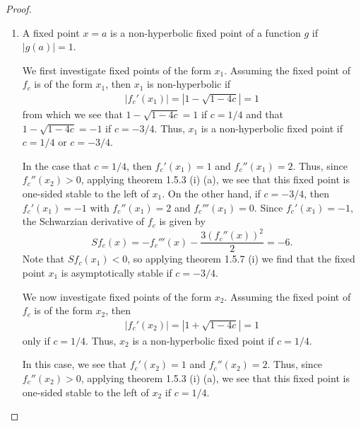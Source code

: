 \begin{proof}
\begin{enumerate}
    \item A fixed point $x = a$ is a non-hyperbolic fixed point of a function $g$ if $|g(a)| =1$.

      We first investigate fixed points of the form $x_1$. Assuming the fixed point of $f_c$ is of the form $x_1$,
      then $x_1$ is non-hyperbolic if
      \begin{align*}
        |f_c'(x_1)| = \left|1-\sqrt{1-4c}\right| = 1
      \end{align*}
      from which we see that $1-\sqrt{1-4c} = 1$ if $c = 1/4$ and that $1-\sqrt{1-4c} = -1$ if $c=-3/4$.
      Thus, $x_1$ is a non-hyperbolic fixed point if $c= 1/4$ or $c=-3/4$.

      In the case that $c=1/4$, then $f_c'(x_1) = 1$ and $f_c''(x_1) = 2$. Thus, since $f_c''(x_2) > 0$, applying theorem 1.5.3 (i) (a), we see that
      this fixed point is one-sided stable to the left of $x_1$. On the other hand, if $c=-3/4$, then $f_c'(x_1) = -1$ with $f_c''(x_1) = 2$ and $f_c'''(x_1) = 0$.
      Since $f_c'(x_1) = -1$, the Schwarzian derivative of $f_c$ is given by
      $$Sf_c(x) = -f_c'''(x) - \frac{3 \left(f_c''(x)\right)^2}{2} = -6.$$
      Note that $Sf_c(x_1) < 0$, so applying theorem 1.5.7 (i) we find that the fixed point $x_1$ is asymptotically stable
      if $c = -3/4$.

      We now investigate fixed points of the form $x_2$. Assuming the fixed point of $f_c$ is of the form $x_2$,
      then
      \begin{align*}
        |f_c'(x_2)| = \left|1+\sqrt{1-4c}\right| = 1
      \end{align*}
      only if $c = 1/4$. Thus, $x_2$ is a non-hyperbolic fixed point if $c= 1/4$.

      In this case, we see that $f_c'(x_2) = 1$ and $f_c''(x_2) = 2$. Thus, since $f_c''(x_2) > 0$, applying theorem 1.5.3 (i) (a), we see that
      this fixed point is one-sided stable to the left of $x_2$ if $c = 1/4$.
  \end{enumerate}
\end{proof}
\newpage

